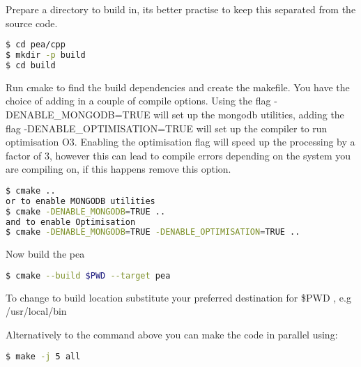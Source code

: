 Prepare a directory to build in, its better practise to keep this separated from the source code.
\begin{lstlisting}[language=bash]
$ cd pea/cpp
$ mkdir -p build
$ cd build
\end{lstlisting}

Run cmake to find the build dependencies and create the makefile. You have the choice of adding in a couple of compile options. 
Using the flag -DENABLE\_MONGODB=TRUE will set up the mongodb utilities, adding the flag -DENABLE\_OPTIMISATION=TRUE will set up the compiler to run optimisation O3. 
Enabling the optimisation flag will speed up the processing by a factor of 3, however this can lead to compile errors depending on the system you are compiling on, if this happens remove this option.

\begin{lstlisting}[language=bash]
$ cmake ..
or to enable MONGODB utilities
$ cmake -DENABLE_MONGODB=TRUE ..
and to enable Optimisation
$ cmake -DENABLE_MONGODB=TRUE -DENABLE_OPTIMISATION=TRUE ..
\end{lstlisting} 
Now build the pea

\begin{lstlisting}[language=bash]
$ cmake --build $PWD --target pea
\end{lstlisting}

To change to build location substitute your preferred destination for \$PWD , e.g /usr/local/bin

Alternatively to the command above you can make the code in parallel using:
\begin{lstlisting}[language=bash]
$ make -j 5 all
\end{lstlisting}

